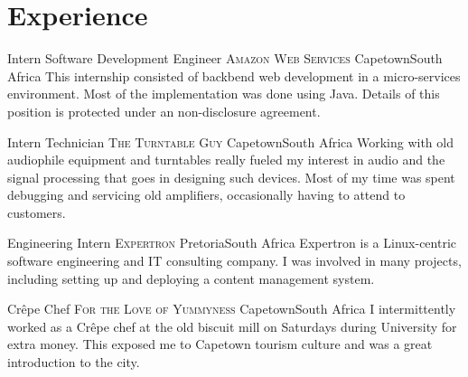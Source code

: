 \documentclass[11pt,a4paper,sans]{moderncv}
\begin{document}


\section{Experience}

{Intern Software Development Engineer}
{\textsc{Amazon Web Services}}
{\newline Capetown}{South Africa}
{This internship consisted of backbend web development in a micro-services
environment. Most of the implementation was done using Java. Details of this
position is protected under an non-disclosure agreement.}

{Intern Technician}
{\textsc{The Turntable Guy}}
{\newline Capetown}{South Africa}
{Working with old audiophile equipment and turntables really fueled my interest in
audio and the signal processing that goes in designing such devices. Most of my
time was spent debugging and servicing old amplifiers, occasionally having to
attend to customers.}

{Engineering Intern}
{\textsc{Expertron}}
{\newline Pretoria}{South Africa}
{Expertron is a Linux-centric software engineering and IT consulting company. I
was involved in many projects, including setting up and deploying a content
management system.}

{Cr\^epe Chef}
{\textsc{For the Love of Yummyness}}
{\newline Capetown}{South Africa}
{I intermittently worked as a Cr\^epe chef at the old biscuit mill on
Saturdays during University for extra money. This exposed me to Capetown tourism
culture and was a great introduction to the city.}
\end{document}

